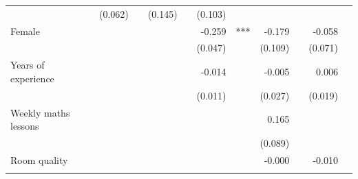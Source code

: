 \documentclass{article}
\begin{document}
\begin{table}[!h]
\begin{tabular}{lllllllllll}
  \multicolumn{1}{l}{} &
  \multicolumn{1}{r}{(0.062)} &
  \multicolumn{1}{l}{} &
  \multicolumn{1}{r}{(0.145)} &
  \multicolumn{1}{l}{} &
  \multicolumn{1}{r}{(0.103)} &
  \multicolumn{1}{l}{} \\
\multicolumn{1}{l}{Female} &
  \multicolumn{1}{r}{} &
  \multicolumn{1}{l}{} &
  \multicolumn{1}{r}{} &
  \multicolumn{1}{l}{} &
  \multicolumn{1}{r}{-0.259} &
  \multicolumn{1}{l}{***} &
  \multicolumn{1}{r}{-0.179} &
  \multicolumn{1}{l}{} &
  \multicolumn{1}{r}{-0.058} &
  \multicolumn{1}{l}{} \\
\multicolumn{1}{l}{} &
  \multicolumn{1}{r}{} &
  \multicolumn{1}{l}{} &
  \multicolumn{1}{r}{} &
  \multicolumn{1}{l}{} &
  \multicolumn{1}{r}{(0.047)} &
  \multicolumn{1}{l}{} &
  \multicolumn{1}{r}{(0.109)} &
  \multicolumn{1}{l}{} &
  \multicolumn{1}{r}{(0.071)} &
  \multicolumn{1}{l}{} \\
\multicolumn{1}{l}{Years of experience} &
  \multicolumn{1}{r}{} &
  \multicolumn{1}{l}{} &
  \multicolumn{1}{r}{} &
  \multicolumn{1}{l}{} &
  \multicolumn{1}{r}{-0.014} &
  \multicolumn{1}{l}{} &
  \multicolumn{1}{r}{-0.005} &
  \multicolumn{1}{l}{} &
  \multicolumn{1}{r}{0.006} &
  \multicolumn{1}{l}{} \\
\multicolumn{1}{l}{} &
  \multicolumn{1}{r}{} &
  \multicolumn{1}{l}{} &
  \multicolumn{1}{r}{} &
  \multicolumn{1}{l}{} &
  \multicolumn{1}{r}{(0.011)} &
  \multicolumn{1}{l}{} &
  \multicolumn{1}{r}{(0.027)} &
  \multicolumn{1}{l}{} &
  \multicolumn{1}{r}{(0.019)} &
  \multicolumn{1}{l}{} \\
\multicolumn{1}{l}{Weekly maths lessons} &
  \multicolumn{1}{r}{} &
  \multicolumn{1}{l}{} &
  \multicolumn{1}{r}{} &
  \multicolumn{1}{l}{} &
  \multicolumn{1}{r}{} &
  \multicolumn{1}{l}{} &
  \multicolumn{1}{r}{0.165} &
  \multicolumn{1}{l}{} &
  \multicolumn{1}{r}{} &
  \multicolumn{1}{l}{} \\
\multicolumn{1}{l}{} &
  \multicolumn{1}{r}{} &
  \multicolumn{1}{l}{} &
  \multicolumn{1}{r}{} &
  \multicolumn{1}{l}{} &
  \multicolumn{1}{r}{} &
  \multicolumn{1}{l}{} &
  \multicolumn{1}{r}{(0.089)} &
  \multicolumn{1}{l}{} &
  \multicolumn{1}{r}{} &
  \multicolumn{1}{l}{} \\
\multicolumn{1}{l}{Room quality} &
  \multicolumn{1}{r}{} &
  \multicolumn{1}{l}{} &
  \multicolumn{1}{r}{} &
  \multicolumn{1}{l}{} &
  \multicolumn{1}{r}{} &
  \multicolumn{1}{l}{} &
  \multicolumn{1}{r}{-0.000} &
  \multicolumn{1}{l}{} &
  \multicolumn{1}{r}{-0.010} &
  \multicolumn{1}{l}{} \\
\multicolumn{1}{l}{} &

\end{tabular}
\end{table}
\end{document}
